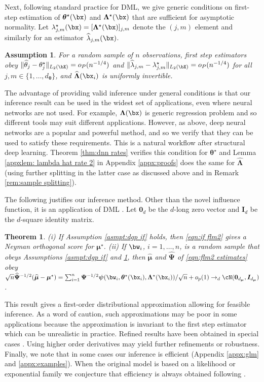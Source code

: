 \documentclass[12pt]{article}
\newtheorem{theorem}{Theorem}
\newtheorem{assumption}{Assumption}
\numberwithin{equation}{section}
\theoremstyle{definition}
\newcommand{\sumi}{\sum_{i=1}^n}
\newcommand{\bmu}{\boldsymbol{\mu}}
\newcommand{\btheta}{\boldsymbol{\theta}}
\newcommand{\bpsi}{\boldsymbol{\psi}}
\newcommand{\bL}{\boldsymbol{\Lambda}}
\newcommand{\bmtrue}{\bmu^\star}
\newcommand{\ttrue}{\theta^\star}
\newcommand{\bttrue}{\btheta^\star}
\newcommand{\bLtrue}{\bL^\star}
\newcommand{\ltrue}{\lambda^\star}
\newcommand{\bmhat}{\bm{\widehat{\mu}}}
\newcommand{\that}{\widehat{\theta}}
\newcommand{\bPsihat}{\bm{\widehat{\Psi}}}
\newcommand{\lhat}{\widehat{\lambda}}
\newcommand{\bLhat}{\widehat{\bL}}
\newcommand{\dmu}{d_{\bmu}}  %
\newcommand{\dtheta}{d_{\btheta}}  %
\begin{document}
Next, following standard practice for DML, we give generic conditions on first-step estimation of $\bttrue(\bx)$ and $\bLtrue(\bx)$ that are sufficient for asymptotic normality. Let $\ltrue_{j,m}(\bx) = [\bLtrue(\bx)]_{j,m}$ denote the $(j,m)$ element and similarly for an estimator $\lhat_{j,m}(\bx)$. 
\begin{assumption}
	\label{asmpt:first step}	
	For a random sample of $n$ observations, first step estimators obey $\| \that_{j} - \ttrue_{j} \|_{L_2(\bX)} = o_P(n^{-1/4})$ and $\|\lhat_{j,m} - \ltrue_{j,m} \|_{L_2(\bX)} = o_P(n^{-1/4})$ for all $j, m \in \{1,\ldots,\dtheta\}$, and $\bLhat(\bx_i)$ is uniformly invertible. 
\end{assumption}
 The advantage of providing valid inference under general conditions is that our inference result can be used in the widest set of applications, even where neural networks are not used. For example, $\bL(\bx)$ is generic regression problem and so different tools may suit different applications. However, as above, deep neural networks are a popular and powerful method, and so we verify that they can be used to satisfy these requirements. This is a natural workflow after structural deep learning. Theorem \ref{thm:dnn rates} verifies this condition for $\bttrue$ and Lemma \ref{appxlem: lambda hat rate 2} in Appendix \ref{appx:proofs} does the same for $\bLhat$ (using further splitting in the latter case as discussed above and in Remark \ref{rem:sample splitting}).



The following  justifies our inference method. Other than the novel influence function, it is an application of DML \cite{Chernozhukov-etal2018_EJ}. Let $\bm{0}_{d}$ be the $d$-long zero vector and $\bm{I}_{d}$ be the $d$-square identity matrix.
\begin{theorem}
	\label{thm:normality}
	(i) If  Assumption \ref{asmpt:dgp if} holds, then \eqref{eqn:if flm2} gives a Neyman orthogonal score for $\bmtrue$. (ii) If $\bw_i$, $i=1,\ldots,n$, is a random sample that obeys Assumptions \ref{asmpt:dgp if} and \ref{asmpt:first step}, then $\bmhat$ and $\bPsihat$ of \eqref{eqn:flm2 estimates} obey $\sqrt{n}\bPsihat^{-1/2}(\bmhat - \bmtrue) =  \sumi \bm{\Psi}^{-1/2} \bpsi(\bw_i, \bttrue(\bx_i), \bLtrue(\bx_i))/\sqrt{n} + o_p(1) \to_d \cN(\bm{0}_{\dmu},\bm{I}_{\dmu})$.
\end{theorem}
This result gives a first-order distributional approximation allowing for feasible inference. As a word of caution, such approximations may be poor in some applications because the approximation is invariant to the first step estimator which can be unrealistic in practice. Refined results have been obtained in special cases \cite[and references therein]{Cattaneo-Farrell-Jansson-Masini2025_JoE}. Using higher order derivatives may yield further refinements or robustness. Finally, we note that in some cases our inference is efficient (Appendix \ref{appx:glm} and \ref{appx:examples}). When the original model is based on a likelihood or exponential family we conjecture that efficiency is always obtained following \cite[Remark 4.1]{Mammen-vandeGeer1997_AoS}.
\end{document}
